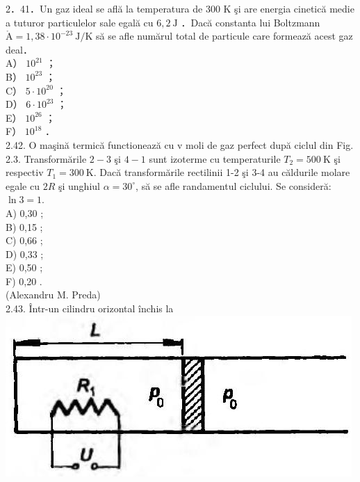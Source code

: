\documentclass[10pt]{article}
\def\AA{\mathring{\mathrm{A}}}
\begin{document}
2．41．Un gaz ideal se află la temperatura de 300 K şi are energia cinetică medie a tuturor particulelor sale egală cu $6,2 \mathrm{~J}$ ．Dacă constanta lui Boltzmann $\AA=1,38 \cdot 10^{-23} \mathrm{~J} / \mathrm{K}$ să se afle numărul total de particule care formează acest gaz deal．\\
A） $10^{21}$ ；\\
B） $10^{23}$ ；\\
C） $5 \cdot 10^{20}$ ；\\
D） $6 \cdot 10^{23}$ ；\\
E） $10^{26}$ ；\\
F） $10^{18}$ ．\\
2.42. O maşină termică functionează cu v moli de gaz perfect după ciclul din Fig. 2.3. Transformările $2-3$ şi $4-1$ sunt izoterme cu temperaturile $T_{2}=500 \mathrm{~K}$ şi respectiv $T_{1}=300 \mathrm{~K}$. Dacă transformările rectilinii 1-2 şi 3-4 au căldurile molare egale cu $2 R$ şi unghiul $\alpha=30^{\circ}$, să se afle randamentul ciclului. Se consideră: $\ln 3=1$.\\
A) 0,30 ;\\
B) 0,15 ;\\
C) 0,66 ;\\
D) 0,33 ;\\
E) 0,50 ;\\
F) 0,20 .\\
(Alexandru M. Preda)\\
2.43. Într-un cilindru orizontal închis la\\
\includegraphics[max width=\textwidth, center]{2025_07_01_5b3ff9fa0d508c8e9f17g-082}
\end{document}
